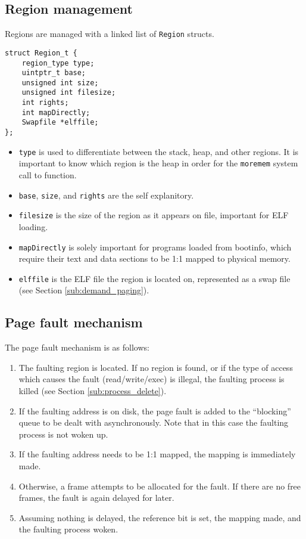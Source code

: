 \documentclass[12pt,english]{article}
\begin{document}
\subsection{Region management}

Regions are managed with a linked list of \texttt{Region} structs.

\begin{verbatim}
struct Region_t {
    region_type type;
    uintptr_t base;
    unsigned int size;
    unsigned int filesize;
    int rights;
    int mapDirectly;
    Swapfile *elffile;
};
\end{verbatim}

\begin{itemize}
\item \texttt{type} is used to differentiate between the stack, heap, and other regions.  It is important to know which region is the heap in order for the \texttt{moremem} system call to function.
\item \texttt{base}, \texttt{size}, and \texttt{rights} are the self explanitory.
\item \texttt{filesize} is the size of the region as it appears on file, important for ELF loading.
\item \texttt{mapDirectly} is solely important for programs loaded from bootinfo, which require their text and data sections to be 1:1 mapped to physical memory.
\item \texttt{elffile} is the ELF file the region is located on, represented as a swap file (see Section \ref{sub:demand_paging}).
\end{itemize}

\subsection{Page fault mechanism}

The page fault mechanism is as follows:
\begin{enumerate}
\item The faulting region is located.  If no region is found, or if the type of access which causes the fault (read/write/exec) is illegal, the faulting process is killed (see Section \ref{sub:process_delete}).
\item If the faulting address is on disk, the page fault is added to the ``blocking'' queue to be dealt with asynchronously.  Note that in this case the faulting process is not woken up.
\item If the faulting address needs to be 1:1 mapped, the mapping is immediately made.
\item Otherwise, a frame attempts to be allocated for the fault.  If there are no free frames, the fault is again delayed for later.
\item Assuming nothing is delayed, the reference bit is set, the mapping made, and the faulting process woken.
\end{enumerate}
\end{document}
